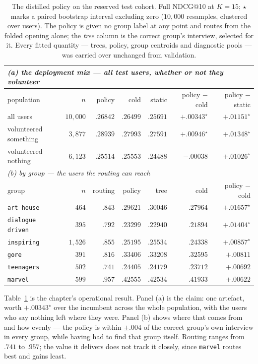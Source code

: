 \documentclass[11pt]{article}
\begin{document}
\begin{table}[t]
\centering
\caption{The distilled policy on the reserved test cohort. Full NDCG@10 at $K{=}15$; $\star$ marks a
paired bootstrap interval excluding zero ($10{,}000$ resamples, clustered over users). The policy is
given no group label at any point and routes from the folded opening alone; the \emph{tree} column is
the correct group's interview, selected for it. Every fitted quantity --- trees, policy, group
centroids and diagnostic pools --- was carried over unchanged from validation.}
\label{tab:policy}
\footnotesize
\begin{tabular}{lr rrr rr}
\toprule
\multicolumn{7}{l}{\emph{(a) the deployment mix --- all test users, whether or not they volunteer}} \\
\midrule
population & $n$ & policy & cold & static & policy $-$ cold & policy $-$ static \\
\midrule
all users & $10{,}000$ & $\mathbf{.26842}$ & $.26499$ & $.25691$ & $\mathbf{+.00343^\star}$ & $+.01151^\star$ \\
volunteered something & $3{,}877$ & $\mathbf{.28939}$ & $.27993$ & $.27591$ & $\mathbf{+.00946^\star}$ & $+.01348^\star$ \\
volunteered nothing & $6{,}123$ & $.25514$ & $.25553$ & $.24488$ & $-.00038$ & $+.01026^\star$ \\
\midrule
\multicolumn{7}{l}{\emph{(b) by group --- the users the routing can reach}} \\
\midrule
group & $n$ & routing & policy & tree & cold & policy $-$ cold \\
\midrule
\texttt{art house} & $464$ & $.843$ & $.29621$ & $.30046$ & $.27964$ & $+.01657^\star$ \\
\texttt{dialogue driven} & $395$ & $.792$ & $.23299$ & $.22940$ & $.21894$ & $+.01404^\star$ \\
\texttt{inspiring} & $1{,}526$ & $.855$ & $.25195$ & $.25534$ & $.24338$ & $+.00857^\star$ \\
\texttt{gore} & $391$ & $.816$ & $.33406$ & $.33208$ & $.32595$ & $+.00811$ \\
\texttt{teenagers} & $502$ & $.741$ & $.24405$ & $.24179$ & $.23712$ & $+.00692$ \\
\texttt{marvel} & $599$ & $.957$ & $.42555$ & $.42534$ & $.41933$ & $+.00622$ \\
\bottomrule
\end{tabular}
\end{table}

Table~\ref{tab:policy} is the chapter's operational result. Panel (a) is the claim: one artefact,
worth $+.00343^\star$ over the incumbent across the whole population, with the users who say nothing
left where they were. Panel (b) shows where that comes from and how evenly --- the policy is within
$\pm.004$ of the correct group's own interview in every group, while having had to find that group
itself. Routing ranges from $.741$ to $.957$; the value it delivers does not track it closely, since
\texttt{marvel} routes best and gains least.
\end{document}
